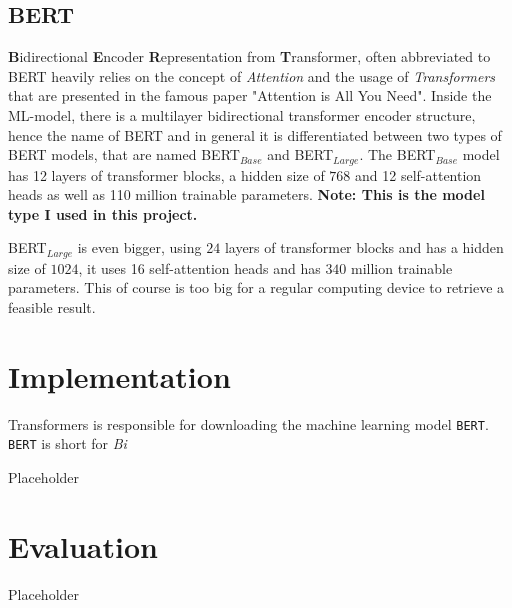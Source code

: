     
    \subsection{BERT}
    \label{sec:-bert}

        \textbf{B}idirectional \textbf{E}ncoder \textbf{R}epresentation from \textbf{T}ransformer, often abbreviated to BERT heavily relies on the concept of \emph{Attention} and the usage of \emph{Transformers} that are presented in the famous paper "Attention is All You Need"\cite{vaswani2017attention}.
        Inside the ML-model, there is a multilayer bidirectional transformer encoder structure, hence the name of BERT and in general it is differentiated between two types of BERT models, that are named BERT$_{Base}$ and BERT$_{Large}$.
        The BERT$_{Base}$ model has 12 layers of transformer blocks, a hidden size of $768$ and 12 self-attention heads as well as 110 million trainable parameters. \textbf{Note: This is the model type I used in this project.}

        BERT$_{Large}$ is even bigger, using $24$ layers of transformer blocks and has a hidden size of $1024$, it uses 16 self-attention heads and has $340$ million trainable parameters. This of course is too big for a regular computing device to retrieve a feasible result.

                
\pagebreak
    \section{Implementation}
    \label{sec:implementation}
            
            Transformers is responsible for downloading the machine learning model \texttt{BERT}.
            \texttt{BERT} is short for \emph{Bi}


        Placeholder

    \section{Evaluation}
    \label{sec:evaluation}

        Placeholder

